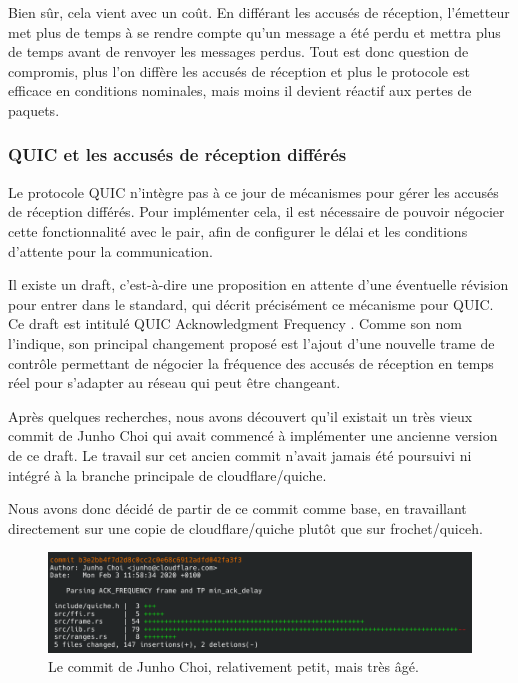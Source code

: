 Bien sûr, cela vient avec un coût. En différant les accusés de réception, l'émetteur met plus de temps à se rendre compte qu'un message a été perdu et mettra plus de temps avant de renvoyer les messages perdus. Tout est donc question de compromis, plus l'on diffère les accusés de réception et plus le protocole est efficace en conditions nominales, mais moins il devient réactif aux pertes de paquets.

\subsubsection{QUIC et les accusés de réception différés}

Le protocole QUIC n'intègre pas à ce jour de mécanismes pour gérer les accusés de réception différés.
Pour implémenter cela, il est nécessaire de pouvoir négocier cette fonctionnalité avec le pair, afin de configurer le délai et les conditions d'attente pour la communication.

Il existe un draft, c'est-à-dire une proposition en attente d'une éventuelle révision pour entrer dans le standard, qui décrit précisément ce mécanisme pour QUIC.
Ce draft est intitulé \guillemotleft QUIC Acknowledgment Frequency \guillemotright. Comme son nom l'indique, son principal changement proposé est l'ajout d'une nouvelle trame de contrôle permettant de négocier la fréquence des accusés de réception en temps réel pour s'adapter au réseau qui peut être changeant.

Après quelques recherches, nous avons découvert qu'il existait un très vieux commit de Junho Choi qui avait commencé à implémenter une ancienne version de ce draft.
Le travail sur cet ancien commit n'avait jamais été poursuivi ni intégré à la branche principale de cloudflare/quiche.

Nous avons donc décidé de partir de ce commit comme base, en travaillant directement sur une copie de cloudflare/quiche plutôt que sur frochet/quiceh.

\begin{figure}[H]
    \centering
    \includegraphics[width=\textwidth]{figures/junho_choi_commit.png}
    \caption{Le commit de Junho Choi, relativement petit, mais très âgé.}
\end{figure}

